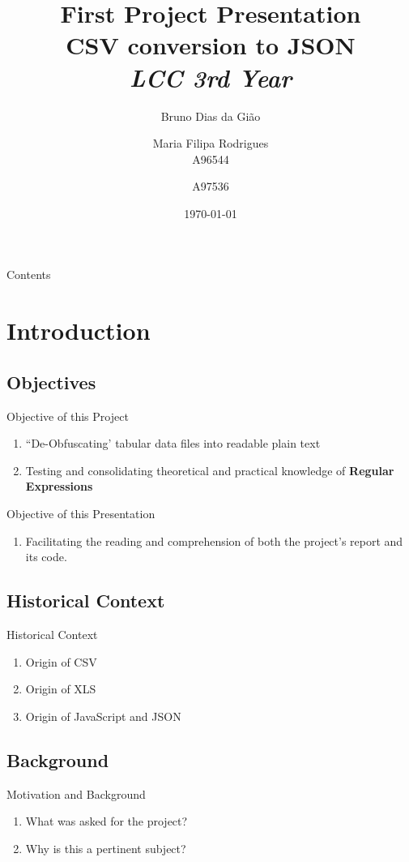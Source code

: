 \documentclass[13.7pt]{beamer}
\title[CSV conversion to JSON]
    {\textbf{First Project Presentation}\\
    \textbf{CSV conversion to JSON} \\
    \textit{LCC 3rd Year}
}
\author[A96544 \and A96536]
   {Bruno Dias da Gião \and Maria Filipa Rodrigues \\
    A96544 \and A97536
}
\date{\today}
\begin{document}
\frame{\titlepage}


\begin{frame}{Contents}
\tableofcontents
\end{frame}


\section{Introduction}

\subsection{Objectives}
\begin{frame} {Objective of this Project}
    \begin{enumerate}
        \item{``De-Obfuscating' tabular data files into readable plain text}
    \pause\item{Testing and consolidating theoretical
            and practical knowledge of \textbf{Regular Expressions}}
    \end{enumerate}
\end{frame}
\begin{frame} {Objective of this Presentation}
    \begin{enumerate}
        \item{Facilitating the reading and comprehension of both the project's
            report and its code.}
    \end{enumerate}
\end{frame}

\subsection{Historical Context}
\begin{frame} {Historical Context}
    \begin{enumerate}
        \item{Origin of CSV}
  \pause\item{Origin of XLS}
  \pause\item{Origin of JavaScript and JSON}
    \end{enumerate}
\end{frame}

\subsection{Background}
\begin{frame}{Motivation and Background}
    \begin{enumerate}
        \item{What was asked for the project?}
  \pause\item{Why is this a pertinent subject?}
    \end{enumerate}
\end{frame}
\end{document}
